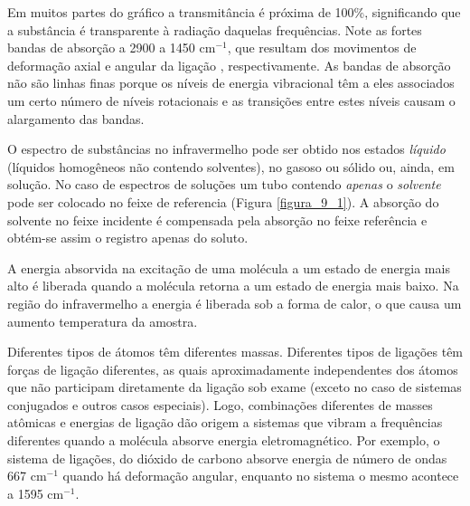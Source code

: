 Em muitos partes do gráfico a transmitância é próxima de 100\%, significando que a substância é transparente à radiação daquelas frequências. Note as fortes bandas de absorção a 2900 a 1450 cm$^{-1}$, que resultam dos movimentos de deformação axial e angular da ligação , respectivamente. As bandas de absorção não são linhas finas porque os níveis de energia vibracional têm a eles associados um certo número de níveis rotacionais e as transições entre estes níveis causam o alargamento das bandas. 

O espectro de substâncias no infravermelho pode ser obtido nos estados \textit{líquido} (líquidos homogêneos não contendo solventes), no gasoso ou sólido ou, ainda, em solução. No caso de espectros de soluções um tubo contendo \textit{apenas} o \textit{solvente} pode ser colocado no feixe de referencia (Figura \ref{figura_9_1}). A absorção do solvente no feixe incidente é compensada pela absorção no feixe referência e obtém-se assim o registro apenas do soluto.

A energia absorvida na excitação de uma molécula a um estado de energia mais alto é liberada quando a molécula retorna a um estado de energia mais baixo. Na região do infravermelho a energia é liberada sob a forma de calor, o que causa um aumento temperatura da amostra.

Diferentes tipos de átomos têm diferentes massas. Diferentes tipos de ligações têm forças de ligação diferentes, as quais aproximadamente independentes dos átomos que não participam diretamente da ligação sob exame (exceto no caso de sistemas conjugados e outros casos especiais). Logo, combinações diferentes de masses atômicas e energias de ligação dão origem a sistemas que vibram a frequências diferentes quando a molécula absorve energia eletromagnético. Por exemplo, o sistema de ligações,  do dióxido de carbono absorve energia de número de ondas 667 cm$^{-1}$ quando há deformação angular, enquanto no sistema  o mesmo acontece a 1595 cm$^{-1}$. 

\begin{figure}[H]
    \centering
    \chemnameinit{}
    \chemnameinit{}
    \qquad\qquad\qquad\qquad
    \chemnameinit{}
\end{figure}

